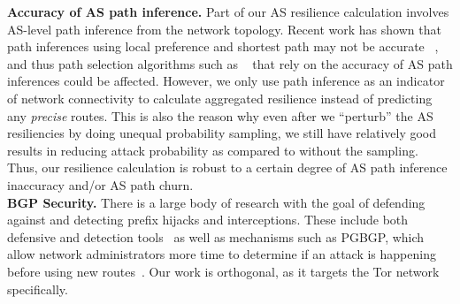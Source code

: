 {\bf Accuracy of AS path inference.}  
Part of our AS resilience calculation involves AS-level path inference from the network topology. Recent work has shown that path inferences using local preference and shortest path may not be accurate ~\cite{juen2015defending}, and thus path selection algorithms such as ~\cite{starov2015measuring} that rely on the accuracy of AS path inferences could be affected. However, we only use path inference as an indicator of network connectivity to calculate aggregated resilience instead of predicting any \emph{precise} routes. This is also the reason why even after we ``perturb'' the AS resiliencies by doing unequal probability sampling, we still have relatively good results in reducing attack probability as compared to without the sampling. Thus, our resilience calculation is robust to a certain degree of AS path inference inaccuracy and/or AS path churn. 
\\
{\bf BGP Security.}
There is a large body of research with the goal of defending against and detecting prefix hijacks and interceptions.  These include both defensive and detection tools~\cite{lad2006phas, hu2007accurate, shi2012detecting, zhang2008ispy, zheng2007light, sriram2009comparative, zhang2007practical} as well as mechanisms such as PGBGP, which allow network administrators more time to determine if an attack is happening before using new routes~\cite{karlin2006pretty}.  Our work is orthogonal, as it targets the Tor network specifically.




